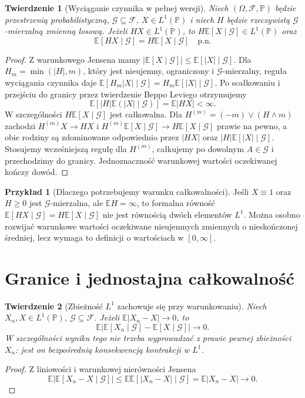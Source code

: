 \documentclass[11pt,a4paper,oneside]{report}
\numberwithin{equation}{chapter}
\theoremstyle{plain}
\newtheorem{twierdzenie}{Twierdzenie}[chapter]
\theoremstyle{definition}
\newtheorem{przyklad}{Przykład}[chapter]
\theoremstyle{remark}
\newcommand{\Prob}{\mathbb{P}}
\newcommand{\E}{\mathbb{E}}
\begin{document}
\begin{twierdzenie}[Wyciąganie czynnika w pełnej wersji]
Niech $(\Omega,\mathcal F,\Prob)$ będzie przestrzenią probabilistyczną,
$\mathcal G\subseteq\mathcal F$, $X\in L^1(\Prob)$ i niech $H$
będzie rzeczywistą $\mathcal G$-mierzalną zmienną losową. Jeżeli
$HX\in L^1(\Prob)$, to $H\E[X\mid\mathcal G]\in L^1(\Prob)$ oraz
\[
\E[HX\mid\mathcal G]=H\E[X\mid\mathcal G]\quad\text{p.n.}
\]
\end{twierdzenie}
\begin{proof}
Z warunkowego Jensena mamy
$|\E[X\mid\mathcal G]|\leq \E[|X|\mid\mathcal G]$.
Dla $H_m=\min(|H|,m)$, który jest nieujemny, ograniczony
i $\mathcal G$-mierzalny, reguła wyciągania czynnika daje
$\E[H_m|X|\mid\mathcal G]=H_m\E[|X|\mid\mathcal G]$.
Po scałkowaniu i przejściu do granicy przez twierdzenie
Beppo Leviego otrzymujemy
\[
\E[|H|\E(|X|\mid\mathcal G)]=\E|HX|<\infty.
\]
W szczególności $H\E[X\mid\mathcal G]$ jest całkowalna.
Dla $H^{(m)}=(-m)\vee(H\wedge m)$ zachodzi
$H^{(m)}X\to HX$ i $H^{(m)}\E[X\mid\mathcal G]\to
H\E[X\mid\mathcal G]$ prawie na pewno, a obie rodziny
są zdominowane odpowiednio przez $|HX|$ oraz
$|H|\E[|X|\mid\mathcal G]$. Stosujemy wcześniejszą
regułę dla $H^{(m)}$, całkujemy po dowolnym $A\in\mathcal G$
i przechodzimy do granicy. Jednoznaczność warunkowej
wartości oczekiwanej kończy dowód.
\end{proof}

\begin{przyklad}[Dlaczego potrzebujemy warunku całkowalności]
Jeśli $X\equiv1$ oraz $H\geq0$ jest $\mathcal G$-mierzalna,
ale $\E H=\infty$, to formalna równość
$\E[HX\mid\mathcal G]=H\E[X\mid\mathcal G]$
nie jest równością dwóch elementów $L^1$.
Można osobno rozwijać warunkowe wartości oczekiwane
nieujemnych zmiennych o nieskończonej średniej,
lecz wymaga to definicji o wartościach w $[0,\infty]$.
\end{przyklad}

\section{Granice i jednostajna całkowalność}

\begin{twierdzenie}[Zbieżność $L^1$ zachowuje się przy warunkowaniu]
Niech $X_n,X\in L^1(\Prob)$, $\mathcal G\subseteq\mathcal F$.
Jeżeli $\E|X_n-X|\to0$, to
\[
\E\bigl|\E[X_n\mid\mathcal G]-\E[X\mid\mathcal G]\bigr|\to0.
\]
W szczególności wyniku tego nie trzeba wyprowadzać
z prawie pewnej zbieżności $X_n$: jest on bezpośrednią
konsekwencją kontrakcji w $L^1$.
\end{twierdzenie}
\begin{proof}
Z liniowości i warunkowej nierówności Jensena
\[
\E\left|\E[X_n-X\mid\mathcal G]\right|
\leq \E\E[|X_n-X|\mid\mathcal G]=\E|X_n-X|\to0.
\]
\end{proof}
\end{document}
